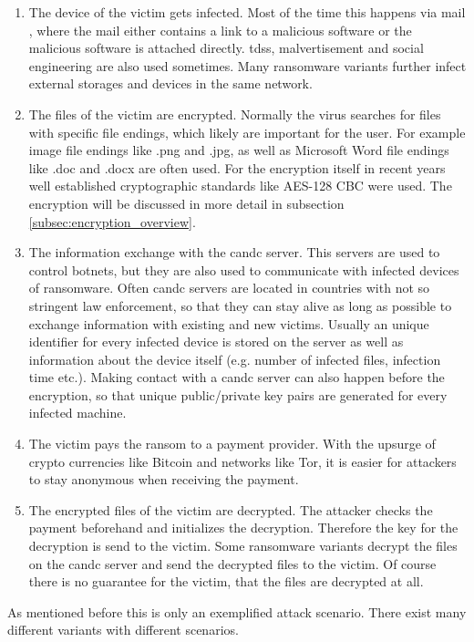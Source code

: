 \begin{enumerate}
\item The device of the victim gets infected. Most of the time this happens via mail \cite{OstermanResearch2016}, where the mail either contains a link to a malicious software or the malicious software is attached directly. \glspl{tds}, malvertisement and social engineering are also used sometimes. Many ransomware variants further infect external storages and devices in the same network.
\item The files of the victim are encrypted. Normally the virus searches for files with specific file endings, which likely are important for the user. For example image file endings like .png and .jpg, as well as Microsoft Word file endings like .doc and .docx are often used. For the encryption itself in recent years well established cryptographic standards like AES-128 CBC were used. The encryption will be discussed in more detail in subsection \ref{subsec:encryption_overview}.
\item The information exchange with the \gls{candc} server. This servers are used to control botnets, but they are also used to communicate with infected devices of ransomware. Often \gls{candc} servers are located in countries with not so stringent law enforcement, so that they can stay alive as long as possible to exchange information with existing and new victims. Usually an unique identifier for every infected device is stored on the server as well as information about the device itself (e.g. number of infected files, infection time etc.). Making contact with a \gls{candc} server can also happen before the encryption, so that unique public/private key pairs are generated for every infected machine.
\item The victim pays the ransom to a payment provider. With the upsurge of crypto currencies like Bitcoin and networks like Tor, it is easier for attackers to stay anonymous when receiving the payment\cite{Liao2016}.
\item The encrypted files of the victim are decrypted. The attacker checks the payment beforehand and initializes the decryption. Therefore the key for the decryption is send to the victim. Some ransomware variants decrypt the files on the \gls{candc} server and send the decrypted files to the victim. Of course there is no guarantee for the victim, that the files are decrypted at all.
\end{enumerate}

As mentioned before this is only an exemplified attack scenario. There exist many different variants with different scenarios.

